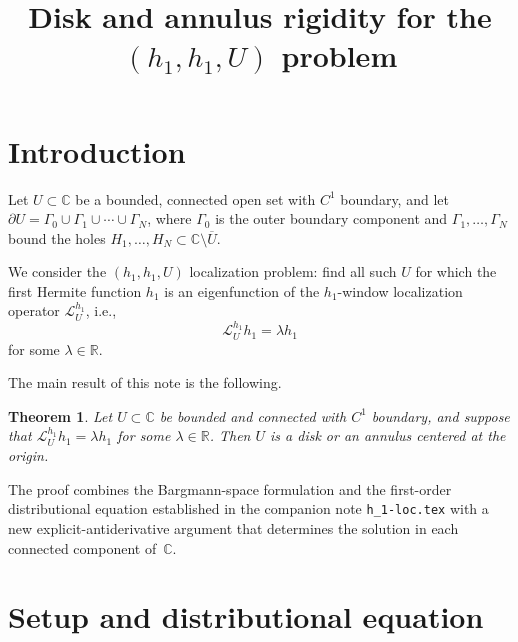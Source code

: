 \documentclass[11pt]{article}
\title{Disk and annulus rigidity for the \((h_1,h_1,U)\) problem}
\author{}
\date{}
\newtheorem{theorem}{Theorem}[section]
\newcommand{\C}{\mathbb C}
\newcommand{\R}{\mathbb R}
\newcommand{\1}{\mathbf 1}
\begin{document}
\maketitle

\section{Introduction}

Let \(U\subset\C\) be a bounded, connected open set with \(C^1\) boundary, and let
\(\partial U=\Gamma_0\cup\Gamma_1\cup\cdots\cup\Gamma_N\), where \(\Gamma_0\) is the outer
boundary component and \(\Gamma_1,\dots,\Gamma_N\) bound the holes
\(H_1,\dots,H_N\subset\C\setminus\overline U\).

We consider the \((h_1,h_1,U)\) localization problem: find all such \(U\) for which the first
Hermite function \(h_1\) is an eigenfunction of the \(h_1\)-window localization operator
\(\mathcal L_U^{h_1}\), i.e.,
\[
\mathcal L_U^{h_1}h_1=\lambda h_1
\]
for some \(\lambda\in\R\).

The main result of this note is the following.

\begin{theorem}\label{thm:main}
Let \(U\subset\C\) be bounded and connected with \(C^1\) boundary, and suppose that
\(\mathcal L_U^{h_1}h_1=\lambda h_1\) for some \(\lambda\in\R\). Then \(U\) is a disk or
an annulus centered at the origin.
\end{theorem}

The proof combines the Bargmann-space formulation and the first-order distributional equation
established in the companion note \texttt{h\_1-loc.tex} with a new explicit-antiderivative
argument that determines the solution in each connected component of~\(\C\).

\section{Setup and distributional equation}
\end{document}
